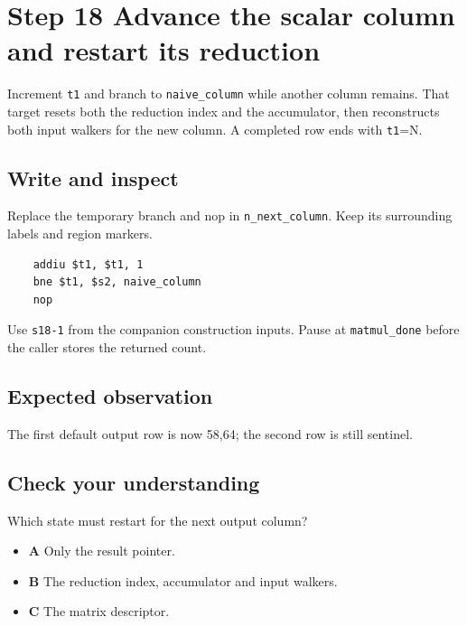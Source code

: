 \section{Step 18 Advance the scalar column and restart its reduction}\label{matmul-s18}

Increment \texttt{t1} and branch to \texttt{naive\_column} while another column remains. That target resets both the reduction index and the accumulator, then reconstructs both input walkers for the new column. A completed row ends with \texttt{t1}=N.

\subsection{Write and inspect}
Replace the temporary branch and nop in \texttt{n\_next\_column}. Keep its surrounding labels and region markers.

\begin{verbatim}
    addiu $t1, $t1, 1
    bne $t1, $s2, naive_column
    nop
\end{verbatim}
Use \texttt{s18-1} from the companion construction inputs. Pause at \texttt{matmul\_done} before the caller stores the returned count.

\subsection{Expected observation}
The first default output row is now 58,64; the second row is still sentinel.

\subsection{Check your understanding}
Which state must restart for the next output column?

\begin{itemize}
  \item \textbf{A} Only the result pointer.
  \item \textbf{B} The reduction index, accumulator and input walkers.
  \item \textbf{C} The matrix descriptor.
\end{itemize}
